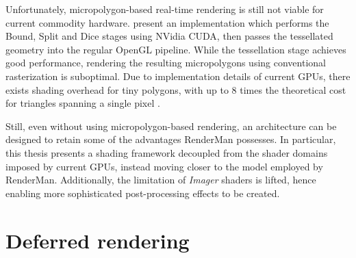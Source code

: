 Unfortunately, micropolygon-based real-time rendering is still not viable for current commodity hardware. \citet{PatneyRealTimeReyes} present an implementation which performs the Bound, Split and Dice stages using NVidia CUDA, then passes the tessellated geometry into the regular OpenGL pipeline. While the tessellation stage achieves good performance, rendering the resulting micropolygons using conventional rasterization is suboptimal. Due to implementation details of current GPUs, there exists shading overhead for tiny polygons, with up to 8 times the theoretical cost for triangles spanning a single pixel \cite{understandingG80}.

Still, even without using micropolygon-based rendering, an architecture can be designed to retain some of the advantages RenderMan possesses. In particular, this thesis presents a shading framework decoupled from the shader domains imposed by current GPUs, instead moving closer to the model employed by RenderMan. Additionally, the limitation of \emph{Imager} shaders is lifted, hence enabling more sophisticated post-processing effects to be created.


\section{Deferred rendering}

